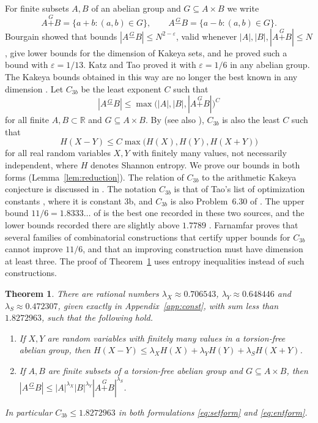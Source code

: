 \documentclass[11pt]{amsart}
\newtheorem{theorem}{Theorem}[section]
\theoremstyle{definition}
\theoremstyle{remark}
\numberwithin{equation}{section}
\newcommand{\R}{\mathbb{R}}
\newcommand{\gp}{\mathbin{\overset{G}{+}}}
\newcommand{\gm}{\mathbin{\overset{G}{-}}}
\newcommand{\CbUp}{1.8272963}
\begin{document}
For finite subsets $A,B$ of an abelian group and $G\subseteq A\times B$ we write
\[
A\gp B=\{a+b:(a,b)\in G\},\qquad A\gm B=\{a-b:(a,b)\in G\}.
\]
Bourgain \cite{Bou99} showed that bounds $|A\gm B|\le N^{2-\varepsilon}$, valid whenever $|A|,|B|,|A\gp B|\le N$, give lower bounds for the dimension of Kakeya sets, and he proved such a bound with $\varepsilon=1/13$. Katz and Tao \cite{KT99} proved it with $\varepsilon=1/6$ in any abelian group. The Kakeya bounds obtained in this way are no longer the best known in any dimension \cite[page 3b]{TaoC}. Let $C_{3b}$ be the least exponent $C$ such that
\begin{equation}\label{eq:setform}
|A\gm B|\le\max\bigl(|A|,|B|,|A\gp B|\bigr)^{C}
\end{equation}
for all finite $A,B\subset\R$ and $G\subseteq A\times B$. By \cite{GR19} (see also \cite[\S1]{Tao25}), $C_{3b}$ is also the least $C$ such that
\begin{equation}\label{eq:entform}
H(X-Y)\le C\max\bigl(H(X),H(Y),H(X+Y)\bigr)
\end{equation}
for all real random variables $X,Y$ with finitely many values, not necessarily independent, where $H$ denotes Shannon entropy. We prove our bounds in both forms (Lemma~\ref{lem:reduction}). The relation of $C_{3b}$ to the arithmetic Kakeya conjecture is discussed in \cite{KT02,GR19,Tao25}. The notation $C_{3b}$ is that of Tao's list of optimization constants \cite{TaoC}, where it is constant 3b, and $C_{3b}$ is also Problem~6.30 of \cite{GGTW25}. The upper bound $11/6=1.8333\ldots$ of \cite{KT99} is the best one recorded in these two sources, and the lower bounds recorded there are slightly above $1.7789$ \cite{Le15,MI26}. Farnamfar \cite{Fa26a,Fa26b} proves that several families of combinatorial constructions that certify upper bounds for $C_{3b}$ cannot improve $11/6$, and that an improving construction must have dimension at least three. The proof of Theorem~\ref{thm:3b} uses entropy inequalities instead of such constructions.

\begin{theorem}\label{thm:3b}
There are rational numbers $\lambda_X\approx0.706543$, $\lambda_Y\approx0.648446$ and $\lambda_S\approx0.472307$, given exactly in Appendix~\ref{app:const}, with sum less than $\CbUp$, such that the following hold.
\begin{enumerate}[label=\textup{(\alph*)}]
\item\label{thm:3b:ent} If $X,Y$ are random variables with finitely many values in a torsion-free abelian group, then $H(X-Y)\le\lambda_XH(X)+\lambda_YH(Y)+\lambda_SH(X+Y)$.
\item\label{thm:3b:set} If $A,B$ are finite subsets of a torsion-free abelian group and $G\subseteq A\times B$, then $|A\gm B|\le|A|^{\lambda_X}|B|^{\lambda_Y}|A\gp B|^{\lambda_S}$.
\end{enumerate}
In particular $C_{3b}\le\CbUp$ in both formulations \eqref{eq:setform} and \eqref{eq:entform}.
\end{theorem}
\end{document}
